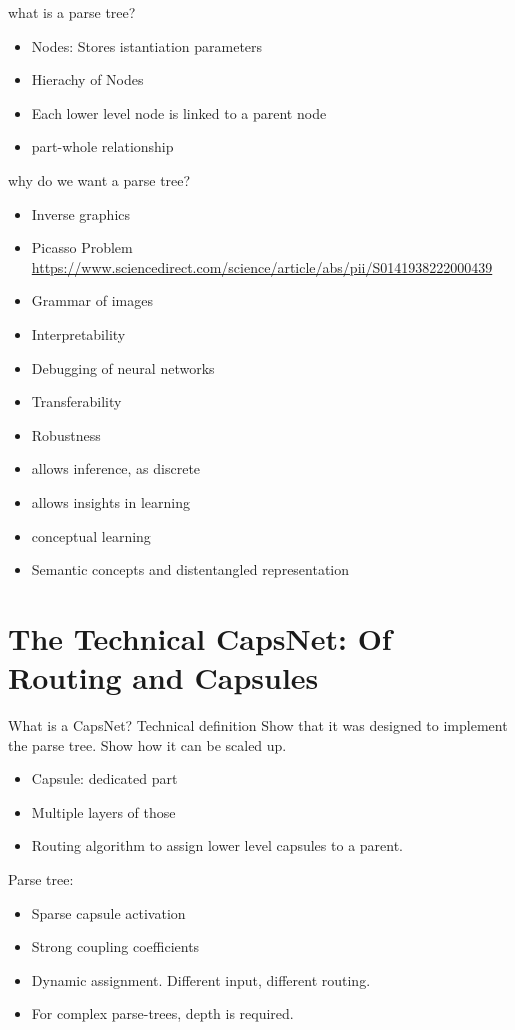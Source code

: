 \documentclass{article}
\begin{document}
what is a parse tree?
\begin{itemize}
	\item Nodes: Stores istantiation parameters
	\item Hierachy of Nodes
	\item Each lower level node is linked to a parent node
	\item part-whole relationship
\end{itemize}
why do we want a parse tree?
\begin{itemize}
	\item Inverse graphics
	\item Picasso Problem \url{https://www.sciencedirect.com/science/article/abs/pii/S0141938222000439}
	\item Grammar of images
	\item Interpretability
	\item Debugging of neural networks
	\item Transferability
	\item Robustness
	\item allows inference, as discrete
	\item allows insights in learning
	\item conceptual learning
	\item Semantic concepts and distentangled representation
\end{itemize}

\section{The Technical CapsNet: Of Routing and Capsules}

What is a CapsNet? Technical definition
Show that it was designed to implement the parse tree.
Show how it can be scaled up.

\begin{itemize}
	\item Capsule: dedicated part
	\item Multiple layers of those
	\item Routing algorithm to assign lower level capsules to a parent.
\end{itemize}

Parse tree:
\begin{itemize}
	\item Sparse capsule activation
	\item Strong coupling coefficients
	\item Dynamic assignment. Different input, different routing.
	\item For complex parse-trees, depth is required.
\end{itemize}
\end{document}

